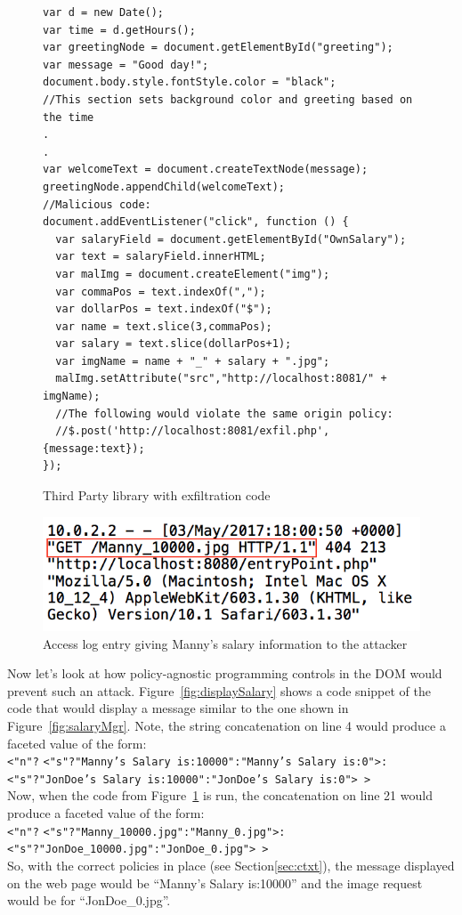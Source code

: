 \begin{figure}
  \begin{lstlisting}
var d = new Date();
var time = d.getHours();
var greetingNode = document.getElementById("greeting");
var message = "Good day!";
document.body.style.fontStyle.color = "black";
//This section sets background color and greeting based on the time
.
.
var welcomeText = document.createTextNode(message);
greetingNode.appendChild(welcomeText);
//Malicious code:
document.addEventListener("click", function () {
  var salaryField = document.getElementById("OwnSalary");
  var text = salaryField.innerHTML;
  var malImg = document.createElement("img");
  var commaPos = text.indexOf(",");
  var dollarPos = text.indexOf("$");
  var name = text.slice(3,commaPos);
  var salary = text.slice(dollarPos+1);
  var imgName = name + "_" + salary + ".jpg";
  malImg.setAttribute("src","http://localhost:8081/" + imgName);
  //The following would violate the same origin policy:
  //$.post('http://localhost:8081/exfil.php',{message:text});
});
  \end{lstlisting}
  \caption{Third Party library with exfiltration code}
  \label{fig:trudyLib}
\end{figure}

\begin{figure}
  \centering
  \includegraphics[scale=0.5, frame]{images/accessLog}
  \caption{Access log entry giving Manny's salary information to the attacker}
  \label{fig:accessLog}
\end{figure}

Now let's look at how policy-agnostic programming controls in the DOM would prevent
such an attack. Figure~\ref{fig:displaySalary} shows a code snippet of the code
that would display a message similar to the one shown in Figure~\ref{fig:salaryMgr}.
Note, the string concatenation on line 4 would produce a faceted value of the
form:\\
\indent \texttt{<"n"?}
  \texttt{<"s"?"Manny's Salary is:10000":"Manny's Salary is:0">:}\\
  \indent\indent\texttt{<"s"?"JonDoe's Salary is:10000":"JonDoe's Salary is:0">~>}
\\\noindent
Now, when the code from Figure~\ref{fig:trudyLib} is run, the concatenation on line
21 would produce a faceted value of the form:\\
\indent \texttt{<"n"?}
\texttt{<"s"?"Manny\_10000.jpg":"Manny\_0.jpg">:}\\
\indent\indent\texttt{<"s"?"JonDoe\_10000.jpg":"JonDoe\_0.jpg">~>}
\noindent \\
So, with the correct policies in place (see Section\ref{sec:ctxt}), the message
displayed on the web page would be ``Manny's Salary is:10000'' and the image request
would be for ``JonDoe\_0.jpg''.


